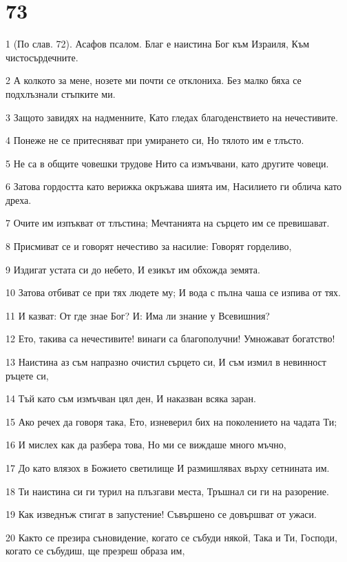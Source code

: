 \chapter{73}

\par 1 (По слав. 72). Асафов псалом. Благ е наистина Бог към Израиля, Към чистосърдечните.
\par 2 А колкото за мене, нозете ми почти се отклониха. Без малко бяха се подхлъзнали стъпките ми.
\par 3 Защото завидях на надменните, Като гледах благоденствието на нечестивите.
\par 4 Понеже не се притесняват при умирането си, Но тялото им е тлъсто.
\par 5 Не са в общите човешки трудове Нито са измъчвани, като другите човеци.
\par 6 Затова гордостта като верижка окръжава шията им, Насилието ги облича като дреха.
\par 7 Очите им изпъкват от тлъстина; Мечтанията на сърцето им се превишават.
\par 8 Присмиват се и говорят нечестиво за насилие: Говорят горделиво,
\par 9 Издигат устата си до небето, И езикът им обхожда земята.
\par 10 Затова отбиват се при тях людете му; И вода с пълна чаша се изпива от тях.
\par 11 И казват: От где знае Бог? И: Има ли знание у Всевишния?
\par 12 Ето, такива са нечестивите! винаги са благополучни! Умножават богатство!
\par 13 Наистина аз съм напразно очистил сърцето си, И съм измил в невинност ръцете си,
\par 14 Тъй като съм измъчван цял ден, И наказван всяка заран.
\par 15 Ако речех да говоря така, Ето, изневерил бих на поколението на чадата Ти;
\par 16 И мислех как да разбера това, Но ми се виждаше много мъчно,
\par 17 До като влязох в Божието светилище И размишлявах върху сетнината им.
\par 18 Ти наистина си ги турил на плъзгави места, Тръшнал си ги на разорение.
\par 19 Как изведнъж стигат в запустение! Съвършено се довършват от ужаси.
\par 20 Както се презира съновидение, когато се събуди някой, Така и Ти, Господи, когато се събудиш, ще презреш образа им,
